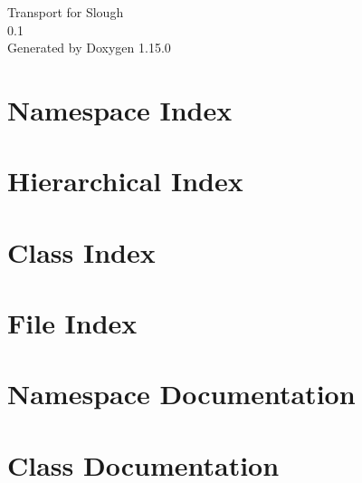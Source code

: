 \documentclass[twoside]{book}
\newcommand{\+}{\discretionary{\mbox{\scriptsize$\hookleftarrow$}}{}{}}
\newcommand{\clearemptydoublepage}{%
    \newpage{\pagestyle{empty}\cleardoublepage}%
  }
\begin{document}
  \raggedbottom
    \hypersetup{pageanchor=false,
                bookmarksnumbered=true,
                pdfencoding=unicode
               }
  \begin{titlepage}
  \vspace*{7cm}
  \begin{center}%
  {\Large Transport for Slough}\\
  [1ex]\large 0.\+1 \\
  \vspace*{1cm}
  {\large Generated by Doxygen 1.15.0}\\
  \end{center}
  \end{titlepage}
  \clearemptydoublepage
  \tableofcontents
  \clearemptydoublepage
  \hypersetup{pageanchor=true}

\chapter{Namespace Index}

\chapter{Hierarchical Index}

\chapter{Class Index}

\chapter{File Index}

\chapter{Namespace Documentation}


\chapter{Class Documentation}

















\end{document}
